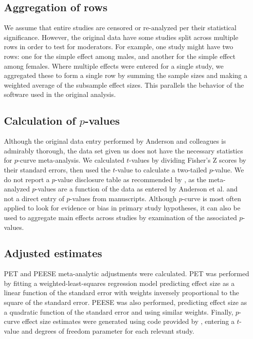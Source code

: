 \documentclass[man]{apa6}
\begin{document}
\subsection{Aggregation of rows}
We assume that entire studies are censored or re-analyzed per their statistical significance. However, the original data have some studies split across multiple rows in order to test for moderators. For example, one study might have two rows: one for the simple effect among males, and another for the simple effect among females. Where multiple effects were entered for a single study, we aggregated these to form a single row by summing the sample sizes and making a weighted average of the subsample effect sizes. This parallels the behavior of the software used in the original analysis. 

\subsection{Calculation of $p$-values}
Although the original data entry performed by Anderson and colleagues is admirably thorough, the data set given us does not have the necessary statistics for $p$-curve meta-analysis. We calculated $t$-values by dividing Fisher's Z scores by their standard errors, then used the $t$-value to calculate a two-tailed $p$-value. We do not report a $p$-value disclosure table as recommended by \citet{Simonsohn:etal:2014}, as the meta-analyzed $p$-values are a function of the data as entered by Anderson et al. and not a direct entry of $p$-values from manuscripts.
Although $p$-curve is most often applied to look for evidence or bias in primary study hypotheses, it can also be used to aggregate main effects across studies by examination of the associated $p$-values.

\subsection{Adjusted estimates}
PET and PEESE meta-analytic adjustments were calculated. PET was performed by fitting a weighted-least-squares regression model predicting effect size as a linear function of the standard error with weights inversely proportional to the square of the standard error. PEESE was also performed, predicting effect size as a quadratic function of the standard error and using similar weights. Finally, $p$-curve effect size estimates were generated using code provided by \citet{Simonsohn:etal:2014}, entering a $t$-value and degrees of freedom parameter for each relevant study.
\end{document}
